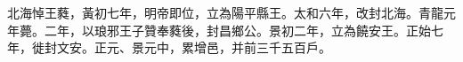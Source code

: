 \begin{pinyinscope}
 
 
 北海悼王蕤，黃初七年，明帝即位，立為陽平縣王。太和六年，改封北海。青龍元年薨。二年，以琅邪王子贊奉蕤後，封昌鄉公。景初二年，立為饒安王。正始七年，徙封文安。正元、景元中，累增邑，并前三千五百戶。
 
 
\end{pinyinscope}